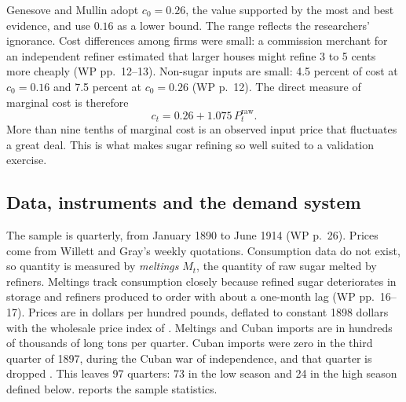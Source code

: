 Genesove and Mullin adopt $c_0 = 0.26$, the value supported by the most and best evidence, and use $0.16$ as a
lower bound. The range reflects the researchers' ignorance. Cost differences among firms were small: a commission
merchant for an independent refiner estimated that larger houses might refine 3 to 5 cents more cheaply
(WP pp.~12--13). Non-sugar inputs are small:
4.5 percent of cost at $c_0 = 0.16$ and 7.5 percent at $c_0 = 0.26$ (WP p.~12). The direct measure of
marginal cost is therefore
\begin{equation}\label{eq:03-gm-direct-cost}
c_t = 0.26 + 1.075\,P^{\mathrm{raw}}_t .
\end{equation}
More than nine tenths of marginal cost is an observed input price that fluctuates a great deal. This is
what makes sugar refining so well suited to a validation exercise.

\subsection{Data, instruments and the demand system}\label{sec:03-sugar-demand}

The sample is quarterly, from January 1890 to June 1914 (WP p.~26). Prices come from Willett and Gray's
weekly quotations. Consumption data do not exist, so quantity is measured by \emph{meltings} $M_t$, the
quantity of raw sugar melted by refiners. Meltings track consumption closely because refined sugar
deteriorates in storage and refiners produced to order with about a one-month lag (WP pp.~16--17). Prices are
in dollars per hundred pounds, deflated to constant 1898 dollars with the wholesale price index of
\citet{Hanes1993}. Meltings and Cuban imports are in hundreds of thousands of long tons per quarter. Cuban
imports were zero in the third quarter of 1897, during the Cuban war of independence, and that quarter is
dropped \citep[pp.~365, 373]{GenesoveMullin1998}. This leaves 97 quarters: 73 in the low season and 24 in
the high season defined below.  reports the sample statistics.

